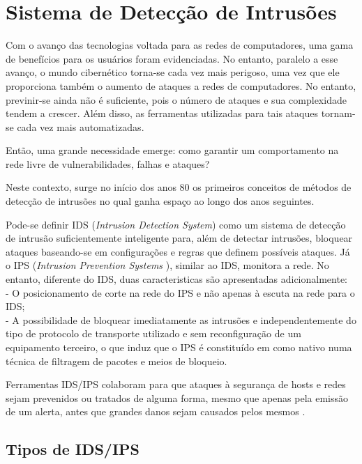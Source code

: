 \chapter{Sistema de Detecção de Intrusões}
\label{chap:IDS}

	Com o avanço das tecnologias voltada para as redes de computadores, uma gama de benefícios para os usuários foram evidenciadas. No entanto, paralelo a esse avanço, o mundo cibernético torna-se cada vez mais perigoso, uma vez que ele proporciona também o aumento de ataques a redes de computadores. No entanto, previnir-se ainda não é suficiente, pois o número de ataques e sua complexidade tendem a crescer. Além disso, as ferramentas utilizadas para tais ataques tornam-se cada vez mais automatizadas.

	Então, uma grande necessidade emerge: como garantir um comportamento na rede livre de vulnerabilidades, falhas e ataques?

	Neste contexto, surge no início dos anos 80 os primeiros conceitos de métodos de detecção de intrusões no qual ganha espaço ao longo dos anos seguintes.

	Pode-se definir IDS (\textit{Intrusion Detection System}) como um sistema de detecção de intrusão suficientemente inteligente para, além de detectar intrusões, bloquear ataques baseando-se em configurações e regras que definem possíveis ataques. Já o IPS (\textit{Intrusion Prevention Systems }), similar ao IDS, monitora a rede. No entanto, diferente do IDS, duas caracteristicas são apresentadas adicionalmente:
	\\- O posicionamento de corte na rede do IPS e não apenas à escuta na rede para o IDS;
	\\- A possibilidade de bloquear imediatamente as intrusões e independentemente do tipo de protocolo de transporte utilizado e sem reconfiguração de um equipamento terceiro, o que induz que o IPS é constituído em como nativo numa técnica de filtragem de pacotes e meios de bloqueio. \cite{Kioskea}

	Ferramentas IDS/IPS colaboram para que ataques à segurança de hosts e redes sejam prevenidos ou tratados de alguma forma, mesmo que apenas pela emissão de um alerta, antes que grandes danos sejam causados pelos mesmos \cite{Comunidade_Snort_Brasil}.

	
	\section{Tipos de IDS/IPS}
	\label{sec:IDS_Tipos}

